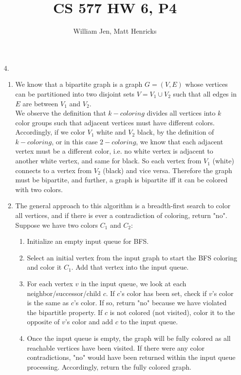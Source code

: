 \documentclass{article}
\title{CS 577 HW 6, P4}
\author{William Jen, Matt Henricks}
\date{}
\begin{document}
\maketitle

\begin{enumerate}
    \item[4.]
        \begin{enumerate}
            \item 
            We know that a bipartite graph is a graph $G=(V, E)$ whose vertices can be partitioned into two disjoint sets $V = V_1 \cup V_2$ such that all edges in $E$ are between $V_1$ and $V_2$. \\
                
            We observe the definition that $k-coloring$ divides all vertices into $k$ color groups such that adjacent vertices must have different colors. Accordingly, if we color $V_1$ white and $V_2$ black, by the definition of $k-coloring$, or in this case $2-coloring$, we know that each adjacent vertex must be a different color, i.e. no white vertex is adjacent to another white vertex, and same for black. So each vertex from $V_1$ (white) connects to a vertex from $V_2$ (black) and vice versa. Therefore the graph must be bipartite, and further, a graph is bipartite iff it can be colored with two colors.
                
            \item The general approach to this algorithm is a breadth-first search to color all vertices, and if there is
            ever a contradiction of coloring, return "no". Suppose we have two colors $C_1$ and $C_2$:
                \begin{enumerate}[label=\arabic*.]
                    \item Initialize an empty input queue for BFS.
                    \item Select an initial vertex from the input graph to start the BFS coloring
                        and color it $C_1$. Add that vertex into the input queue.
                    \item For each vertex $v$ in the input queue, we look at each neighbor/successor/child $c$. If $c$'s color
                        has been set, check if $v$'s color is the same as $c$'s color. If so, return "no" because
                        we have violated the bipartitle property. If $c$ is not colored (not visited), color it to 
                        the opposite of $v$'s color and add $c$ to the input queue.
                    \item Once the input queue is empty, the graph will be fully colored as all reachable
                        vertices have been visited. If there were any color contradictions, "no" would have been
                        returned within the input queue processing. Accordingly, return the fully colored graph.
                \end{enumerate}
            

\end{enumerate}
\end{enumerate}
\end{document}
